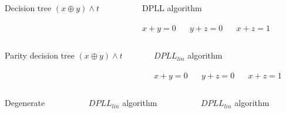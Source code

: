 \begin{frame}
    \begin{columns}
        \begin{column}{5cm}
            Decision tree
            $(x \oplus y) \land t$
            
			
        \end{column}
        \begin{column}{5cm}
            DPLL algorithm
            
            $x + y = 0$ ~~
            $y + z = 0$ ~~
            $x + z = 1$
            
            
        \end{column}
    \end{columns}

\end{frame}

\begin{frame}
    \begin{columns}
        \begin{column}{5cm}
            Parity decision tree
            $(x \oplus y) \land t$
            
			
        \end{column}
        \begin{column}{5cm}
            $DPLL_{lin}$ algorithm
            
            $x + y = 0$ ~~
            $y + z = 0$ ~~
            $x + z = 1$
            
            
        \end{column}
    \end{columns}

\end{frame}


\begin{frame}
    \begin{columns}
        \begin{column}{3cm}
            Degenerate
            
            
        \end{column}
        \begin{column}{3cm}
            $DPLL_{lin}$ algorithm
        \end{column}
        \begin{column}{3cm}
            $DPLL_{lin}$ algorithm
            
        \end{column}
    \end{columns}

\end{frame}

